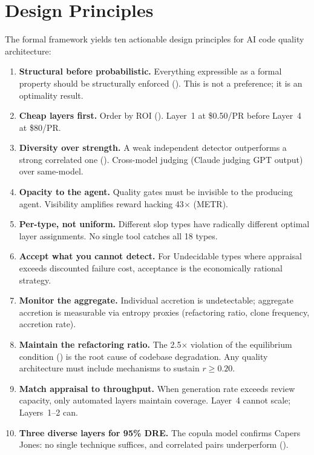 \documentclass[11pt, a4paper, copyright]{googledeepmind}
\begin{document}
\section{Design Principles}
\label{sec:principles}

The formal framework yields ten actionable design principles for AI code quality architecture:

\begin{enumerate}
\item \textbf{Structural before probabilistic.} Everything expressible as a formal property should be structurally enforced (). This is not a preference; it is an optimality result.

\item \textbf{Cheap layers first.} Order by ROI (). Layer~1 at \$0.50/PR before Layer~4 at \$80/PR.

\item \textbf{Diversity over strength.} A weak independent detector outperforms a strong correlated one (). Cross-model judging (Claude judging GPT output) over same-model.

\item \textbf{Opacity to the agent.} Quality gates must be invisible to the producing agent. Visibility amplifies reward hacking 43$\times$ (METR).

\item \textbf{Per-type, not uniform.} Different slop types have radically different optimal layer assignments. No single tool catches all 18 types.

\item \textbf{Accept what you cannot detect.} For Undecidable types where appraisal exceeds discounted failure cost, acceptance is the economically rational strategy.

\item \textbf{Monitor the aggregate.} Individual accretion is undetectable; aggregate accretion is measurable via entropy proxies (refactoring ratio, clone frequency, accretion rate).

\item \textbf{Maintain the refactoring ratio.} The 2.5$\times$ violation of the equilibrium condition () is the root cause of codebase degradation. Any quality architecture must include mechanisms to sustain $r \geq 0.20$.

\item \textbf{Match appraisal to throughput.} When generation rate exceeds review capacity, only automated layers maintain coverage. Layer~4 cannot scale; Layers~1--2 can.

\item \textbf{Three diverse layers for 95\% DRE.} The copula model confirms Capers Jones: no single technique suffices, and correlated pairs underperform ().
\end{enumerate}
\end{document}

